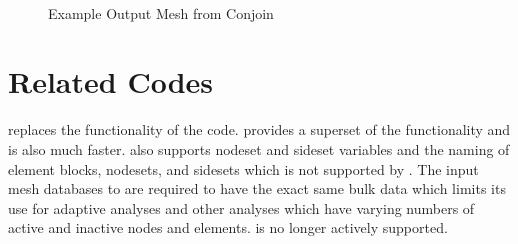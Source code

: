 \begin{figure}[ht]
\centering
{}
\\
\caption{Example Output Mesh from Conjoin}
\end{figure}

\section{Related Codes}
\conjoin{} replaces the functionality of the
\cite{bib:conex} code.  \conjoin{} provides a superset of
the  functionality and is also much faster. \conjoin{}
also supports nodeset and sideset variables and the naming of element
blocks, nodesets, and sidesets which is not supported by
. The input mesh databases to  are required to
have the exact same bulk data which limits its use for adaptive
analyses and other analyses which have varying numbers of active and
inactive nodes and elements.   is no longer actively
supported. 
